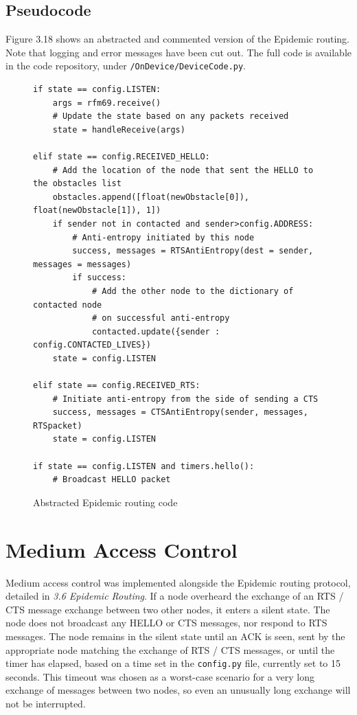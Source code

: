 \documentclass[12pt,a4paper]{report}
\begin{document}
\subsection{Pseudocode}
Figure 3.18 shows an abstracted and commented version of the Epidemic routing. Note that logging and error messages have been cut out. The full code is available in the code repository, under \verb'/OnDevice/DeviceCode.py'.
\begin{figure}[h] 
\begin{verbatim}
if state == config.LISTEN:
    args = rfm69.receive()
    # Update the state based on any packets received
    state = handleReceive(args) 

elif state == config.RECEIVED_HELLO:
    # Add the location of the node that sent the HELLO to the obstacles list
    obstacles.append([float(newObstacle[0]), float(newObstacle[1]), 1])
    if sender not in contacted and sender>config.ADDRESS:
        # Anti-entropy initiated by this node
        success, messages = RTSAntiEntropy(dest = sender, messages = messages)
        if success:
            # Add the other node to the dictionary of contacted node 
            # on successful anti-entropy
            contacted.update({sender : config.CONTACTED_LIVES})
    state = config.LISTEN

elif state == config.RECEIVED_RTS:
    # Initiate anti-entropy from the side of sending a CTS       
    success, messages = CTSAntiEntropy(sender, messages, RTSpacket)
    state = config.LISTEN

if state == config.LISTEN and timers.hello():
    # Broadcast HELLO packet
\end{verbatim}
\caption{Abstracted Epidemic routing code}
\end{figure}
\FloatBarrier
\newpage
\section{Medium Access Control}
Medium access control was implemented alongside the Epidemic routing protocol, detailed in \emph{3.6 Epidemic Routing}. If a node overheard the exchange of an RTS / CTS message exchange between two other nodes, it enters a silent state. The node does not broadcast any HELLO or CTS messages, nor respond to RTS messages. The node remains in the silent state until an ACK is seen, sent by the appropriate node matching the exchange of RTS / CTS messages, or until the timer has elapsed, based on a time set in the \verb'config.py' file, currently set to 15 seconds. This timeout was chosen as a worst-case scenario for a very long exchange of messages between two nodes, so even an unusually long exchange will not be interrupted. 
\end{document}
